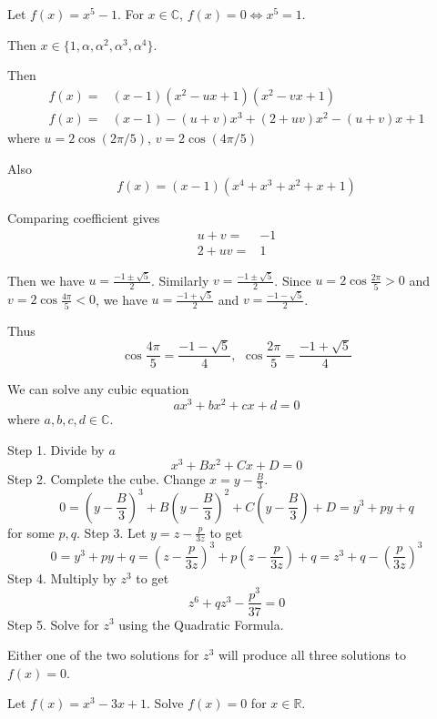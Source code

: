 

\begin{exmp}
Let $f(x) = x^5-1$. For $x\in\mathbb{C}$, $f(x) = 0\Leftrightarrow x^5 = 1$.

Then $x\in\{1,\alpha, \alpha^2,\alpha^3,\alpha^4\}$.

Then 
\begin{align*}
    f(x) = & (x-1)(x^2-ux+1)(x^2-vx+1)\\
    f(x) = & (x-1)- (u+v)x^3+(2+uv)x^2- (u+v)x +1
\end{align*}
where $u = 2\cos (2\pi/5)$,  $v = 2\cos (4\pi/5)$

Also \[f(x) = (x-1)(x^4+x^3+x^2+x+1)\]



Comparing coefficient gives\[
\begin{array}{ll}
     u+v=&-1  \\
     2+uv=&1
\end{array}\]

Then we have $u = \frac{-1\pm\sqrt{5}}{2}$. Similarly $v = \frac{-1\pm\sqrt{5}}{2}$. Since $u=2\cos{\frac{2\pi}{5}}>0$ and $v=2\cos{\frac{4\pi}{5}}<0$, we have $u = \frac{-1+\sqrt{5}}{2}$ and $v = \frac{-1-\sqrt{5}}{2}$.

Thus \[\cos{\frac{4\pi}{5}} =\frac{-1-\sqrt{5}}{4}, \ \,  \cos {\frac{2\pi}{5}} =\frac{-1+\sqrt{5}}{4}\]
\end{exmp}


\begin{exmp}
We can solve any cubic equation \[ax^3+bx^2+cx +d = 0\] where $a,b,c,d \in\mathbb{C}$.

Step 1. Divide by $a$ \[x^3 + Bx^2+Cx+D=0\]
Step 2. Complete the cube. Change $x = y - \frac{B}{3}$.
\[0 = (y - \frac{B}{3})^3 + B(y - \frac{B}{3})^2+C(y - \frac{B}{3})+D= y^3 + py + q\] for some $p,q$.
Step 3. Let $y = z-\frac{p}{3z}$ to get \[0 = y^3 + py + q = (z-\frac{p}{3z})^3 + p(z-\frac{p}{3z}) + q = z^3 + q - (\frac{p}{3z})^3\]
Step 4. Multiply by $z^3$ to get \[z^6 + qz^3 - \frac{p^3}{37} = 0\]
Step 5. Solve for $z^3$ using the Quadratic Formula.
\end{exmp}

\begin{rem}
Either one of the two solutions for $z^3$ will produce all three solutions to $f(x) = 0$.
\end{rem}

\begin{exmp}
Let $f(x) = x^3 -3x + 1$. Solve $f(x) = 0$ for $x\in\mathbb{R}$.
\end{exmp}

